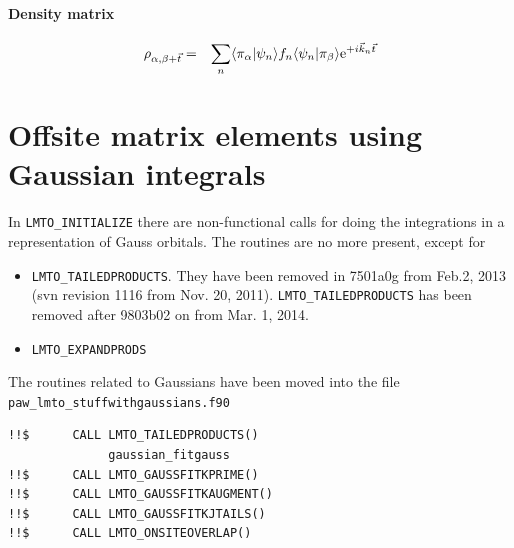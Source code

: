 \documentclass[11pt,a4paper]{report}
\begin{document}
\subsubsection{Density matrix}
\begin{eqnarray}
\rho_{\alpha,\beta+\vec{t}}
&=&
\sum_n \langle\pi_\alpha|\psi_n\rangle f_n
\langle\psi_n|\pi_\beta\rangle
\mathrm{e}^{+i\vec{k}_n\vec{t}}
\end{eqnarray}

\chapter{Offsite matrix elements using Gaussian integrals}
In \verb|LMTO_INITIALIZE| there are non-functional calls for doing the
integrations in a representation of Gauss orbitals. The routines are
no more present, except for 
\begin{itemize}
\item \verb|LMTO_TAILEDPRODUCTS|. They have been
removed in 7501a0g from Feb.2, 2013 (svn revision 1116 from Nov. 20,
2011). \verb|LMTO_TAILEDPRODUCTS| has been removed after 9803b02 on from
 Mar. 1, 2014.
\item \verb|LMTO_EXPANDPRODS|
\end{itemize}

The routines related to Gaussians have been moved into the file
\verb|paw_lmto_stuffwithgaussians.f90|

\begin{verbatim}
!!$      CALL LMTO_TAILEDPRODUCTS()
              gaussian_fitgauss
!!$      CALL LMTO_GAUSSFITKPRIME()
!!$      CALL LMTO_GAUSSFITKAUGMENT()
!!$      CALL LMTO_GAUSSFITKJTAILS()
!!$      CALL LMTO_ONSITEOVERLAP()
\end{verbatim}

\end{document}
